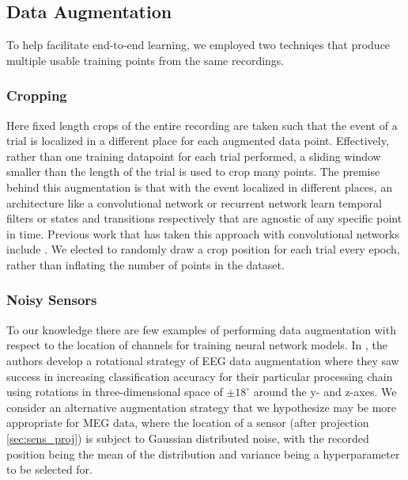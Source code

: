 \documentclass[utf8]{frontiersSCNS} %
\begin{document}
\subsection{Data Augmentation}

To help facilitate end-to-end learning, we employed two techniqes that produce multiple usable training points from the same recordings. 

\subsubsection{Cropping}

Here fixed length crops of the entire recording are taken such that the event of a trial is localized in a different place for each augmented data point. Effectively, rather than one training datapoint for each trial performed, a sliding window smaller than the length of the trial is used to crop many points. The premise behind this augmentation is that with the event localized in different places, an architecture like a convolutional network or recurrent network learn temporal filters or states and transitions respectively that are agnostic of any specific point in time. Previous work that has taken this approach with convolutional networks include \cite{Schirrmeister2017, Sun}. We elected to randomly draw a crop position for each trial every epoch, rather than inflating the number of points in the dataset.



\subsubsection{Noisy Sensors}

To our knowledge there are few examples of performing data augmentation with respect to the location of channels for training neural network models. In \cite{Krell2017}, the authors develop a rotational strategy of EEG data augmentation where they saw success in increasing classification accuracy for their particular processing chain using rotations in three-dimensional space of $\pm 18^{\circ}$ around the y- and z-axes. We consider an alternative augmentation strategy that we hypothesize may be more appropriate for MEG data, where the location of a sensor (after projection \ref{sec:sens_proj}) is subject to Gaussian distributed noise, with the recorded position being the mean of the distribution and variance being a hyperparameter to be selected for.
\end{document}
